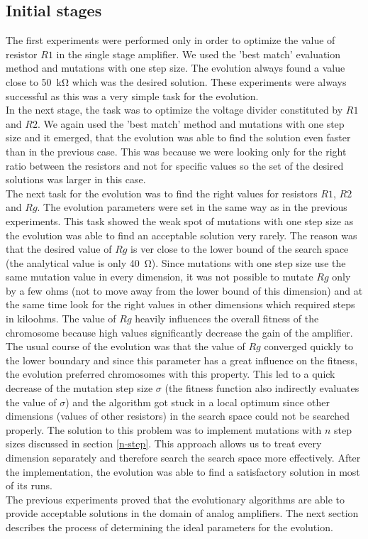 \subsection{Initial stages}
The first experiments were performed only in order to optimize the value of resistor $R1$ in the single stage amplifier. We used the 'best match' evaluation method and mutations with one step size. The evolution always found a value close to \SI{50}{\kilo\ohm} which was the desired solution. These experiments were always successful as this was a very simple task for the evolution.\\
In the next stage, the task was to optimize the voltage divider constituted by $R1$ and $R2$. We again used the 'best match' method and mutations with one step size and it emerged, that the evolution was able to find the solution even faster than in the previous case. This was because we were looking only for the right ratio between the resistors and not for specific values so the set of the desired solutions was larger in this case.\\
The next task for the evolution was to find the right values for resistors $R1$, $R2$ and $Rg$. The evolution parameters were set in the same way as in the previous experiments. This task showed the weak spot of mutations with one step size as the evolution was able to find an acceptable solution very rarely. The reason was that the desired value of $Rg$ is ver close to the lower bound of the search space (the analytical value is only \SI{40}{\ohm}). Since mutations with one step size use the same mutation value in every dimension, it was not possible to mutate $Rg$ only by a few ohms (not to move away from the lower bound of this dimension) and at the same time look for the right values in other dimensions which required steps in kiloohms. The value of $Rg$ heavily influences the overall fitness of the chromosome because high values significantly decrease the gain of the amplifier. The usual course of the evolution was that the value of $Rg$ converged quickly to the lower boundary and since this parameter has a great influence on the fitness, the evolution preferred chromosomes with this property. This led to a quick decrease of the mutation step size $\sigma$ (the fitness function also indirectly evaluates the value of $\sigma$) and the algorithm got stuck in a local optimum since other dimensions (values of other resistors) in the search space could not be searched properly. The solution to this problem was to implement mutations with $n$ step sizes discussed in section \ref{n-step}. This approach allows us to treat every dimension separately and therefore search the search space more effectively. After the implementation, the evolution was able to find a satisfactory solution in most of its runs.\\
The previous experiments proved that the evolutionary algorithms are able to provide acceptable solutions in the domain of analog amplifiers. The next section describes the process of determining the ideal parameters for the evolution.


